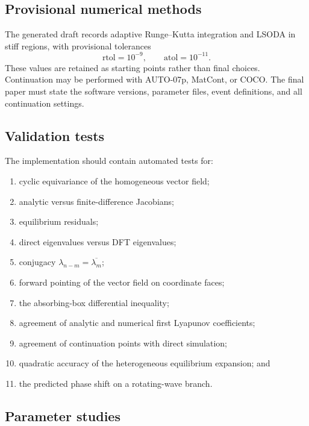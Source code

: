 \documentclass[11pt, reqno]{amsart}
\theoremstyle{definition}
\theoremstyle{remark}
\begin{document}
	\subsection{Provisional numerical methods}
	
	The generated draft records adaptive Runge--Kutta integration and LSODA in
	stiff regions, with provisional tolerances
	\[
	\mathrm{rtol}=10^{-9},
	\qquad
	\mathrm{atol}=10^{-11}.
	\]
	These values are retained as starting points rather than final choices.
	Continuation may be performed with AUTO-07p, MatCont, or COCO.  The final paper
	must state the software versions, parameter files, event definitions, and all
	continuation settings.
	
	
	\subsection{Validation tests}
	
	The implementation should contain automated tests for:
	\begin{enumerate}[label=(V\arabic*),leftmargin=3em]
		\item cyclic equivariance of the homogeneous vector field;
		\item analytic versus finite-difference Jacobians;
		\item equilibrium residuals;
		\item direct eigenvalues versus DFT eigenvalues;
		\item conjugacy $\lambda_{n-m}=\overline{\lambda_m}$;
		\item forward pointing of the vector field on coordinate faces;
		\item the absorbing-box differential inequality;
		\item agreement of analytic and numerical first Lyapunov coefficients;
		\item agreement of continuation points with direct simulation;
		\item quadratic accuracy of the heterogeneous equilibrium expansion; and
		\item the predicted phase shift on a rotating-wave branch.
	\end{enumerate}
	
	\subsection{Parameter studies}
	
\end{document}
